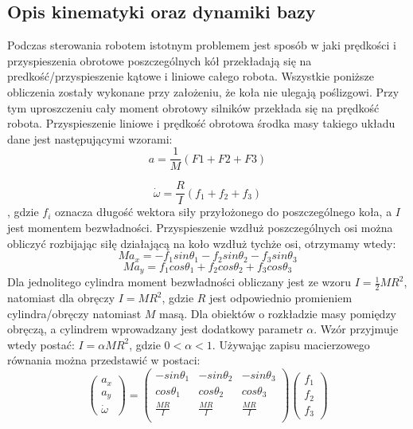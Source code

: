 \subsection{Opis kinematyki oraz dynamiki bazy}
Podczas sterowania robotem istotnym problemem jest sposób w jaki prędkości i przyspieszenia obrotowe poszczególnych kół przekładają się
na predkość/przyspieszenie kątowe i liniowe całego robota. Wszystkie poniższe obliczenia zostały wykonane przy założeniu, że koła nie ulegają poślizgowi.
Przy tym uproszczeniu cały moment obrotowy silników przekłada się na prędkość robota.
Przyspieszenie liniowe i prędkość obrotowa środka masy takiego układu dane jest następującymi wzorami:
\begin{equation}
a=\frac{1}{M}(F1+F2+F3)
\end{equation}

\begin{equation}
\dot{ \omega }=\frac{R}{I}(f_1+f_2+f_3)
\end{equation}
, gdzie $f_i$ oznacza długość wektora siły przyłożonego do poszczególnego koła, a $I$  jest momentem bezwładności.
Przyspieszenie wzdłuż poszczególnych osi można obliczyć rozbijając siłę działającą na koło wzdłuż tychże osi, otrzymamy wtedy:
\begin{equation}
Ma_x=-f_1sin\theta_1 - f_2sin\theta_2 - f_3sin\theta_3
\end{equation}
\begin{equation}
Ma_y=f_1cos\theta_1 + f_2cos\theta_2 + f_3cos\theta_3
\end{equation}
Dla jednolitego cylindra moment bezwładności obliczany jest ze wzoru $I=\frac{1}{2}MR^2$, natomiast dla obręczy $I=MR^2$, gdzie $R$ jest odpowiednio promieniem
\mbox{cylindra/obręczy} natomiast $M$ masą. Dla obiektów o rozkładzie masy pomiędzy
obręczą, a cylindrem wprowadzany jest dodatkowy parametr $\alpha$. Wzór przyjmuje wtedy postać: $I=\alpha MR^2$, gdzie $0<\alpha<1$.
Używając zapisu macierzowego równania można przedstawić w postaci:
\begin{equation}
 \begin{pmatrix}
  a_x\\
  a_y\\
  \dot{\omega}
 \end{pmatrix}
  =
\begin{pmatrix}
  -sin\theta_1 & -sin\theta_2 & -sin\theta_3 \\
  cos\theta_1 & cos\theta_2 & cos\theta_3 \\
  \frac{MR}{I} & \frac{MR}{I} & \frac{MR}{I}\\
 \end{pmatrix} 
 \begin{pmatrix}
  f_1\\
  f_2\\
  f_3
 \end{pmatrix}
\end{equation}

